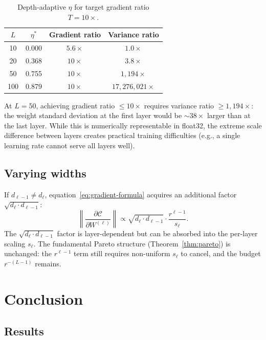 \documentclass[11pt,a4paper]{article}
\theoremstyle{definition}
\begin{document}
\begin{table}[H]
\centering
\caption{Depth-adaptive $\eta$ for target gradient ratio $T = 10\times$.}
\label{tab:adaptive}
\begin{tabular}{c c c c}
\toprule
$L$ & $\eta^{\ast}$ & Gradient ratio & Variance ratio \\
\midrule
10  & 0.000 & $5.6\times$  & $1.0\times$ \\
20  & 0.368 & $10\times$   & $3.8\times$ \\
50  & 0.755 & $10\times$   & $1{,}194\times$ \\
100 & 0.879 & $10\times$   & $17{,}276{,}021\times$ \\
\bottomrule
\end{tabular}
\end{table}

At $L = 50$, achieving gradient ratio $\leq 10\times$ requires
variance ratio $\geq 1{,}194\times$: the weight standard deviation
at the first layer would be $\sim\!38\times$ larger than at the
last layer.  While this is numerically representable in float32,
the extreme scale difference between layers creates practical
training difficulties (e.g., a single learning rate cannot
serve all layers well).

\subsection{Varying widths}
\label{sec:varying-width}

If $d_{\ell-1} \neq d_\ell$, equation~\eqref{eq:gradient-formula}
acquires an additional factor $\sqrt{d_\ell \cdot d_{\ell-1}}$:
\[
  \left\|\frac{\partial\mathcal{C}}{\partial W^{(\ell)}}\right\|
  \propto \sqrt{d_\ell \cdot d_{\ell-1}} \cdot \frac{r^{\ell-1}}{s_\ell}.
\]
The $\sqrt{d_\ell \cdot d_{\ell-1}}$ factor is layer-dependent
but can be absorbed into the per-layer scaling $s_\ell$.  The
fundamental Pareto structure (Theorem~\ref{thm:pareto}) is
unchanged: the $r^{\ell-1}$ term still requires non-uniform
$s_\ell$ to cancel, and the budget $r^{-(L-1)}$ remains.


\section{Conclusion}
\label{sec:conclusion}

\subsection{Results}
\end{document}
